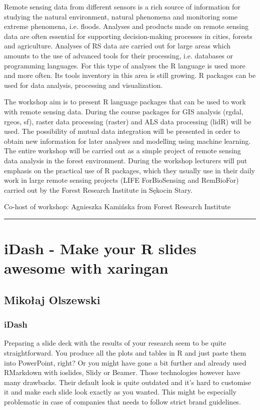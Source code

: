 \documentclass [12pt]{article}
\begin{document}
Remote sensing data from different sensors is a rich source of information for studying the natural environment, natural phenomena and monitoring some extreme phenomena, i.e. floods. Analyses and products made on remote sensing data are often essential for supporting decision-making processes in cities, forests and agriculture. Analyses of RS data are carried out for large areas which amounts to the use of advanced tools for their processing, i.e. databases or programming languages. For this type of analyses the R language is used more and more often. Its tools inventory in this area is still growing. R packages can be used for data analysis, processing and visualization.

The workshop aim is to present R language packages that can be used to work with remote sensing data. During the course packages for GIS analysis (rgdal, rgeos, sf), raster data processing (raster) and ALS data processing (lidR) will be used. The possibility of mutual data integration will be presented in order to obtain new information for later analyses and modelling using machine learning. The entire workshop will be carried out as a simple project of remote sensing data analysis in the forest environment. During the workshop lecturers will put emphasis on the practical use of R packages, which they usually use in their daily work in large remote sensing projects (LIFE ForBioSensing and RemBioFor) carried out by the Forest Research Institute in Sękocin Stary.

Co-host of workshop: Agnieszka Kamińska from Forest Research Institute

\noindent\rule{\textwidth}{1pt}
\section{iDash - Make your R slides awesome with xaringan}
\subsection*{Mikołaj Olszewski}
\subsubsection*{iDash}

Preparing a slide deck with the results of your research seem to be quite straightforward. You produce all the plots and tables in R and just paste them into PowerPoint, right? Or you might have gone a bit further and already used RMarkdown with ioslides, Slidy or Beamer. Those technologies however have many drawbacks. Their default look is quite outdated and it’s hard to customise it and make each slide look exactly as you wanted. This might be especially problematic in case of companies that needs to follow strict brand guidelines.
\end{document}
